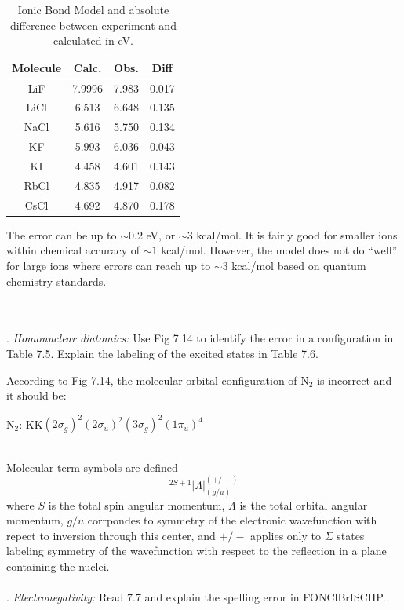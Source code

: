 \documentclass{article}
\begin{document}
{  \begin{table}[H]
    \centering
    \caption{Ionic Bond Model and absolute difference between experiment and calculated
      in eV.}
    \begin{tabular}{cccc}
      Molecule & Calc. & Obs. & Diff \\
      \hline
      LiF  & 7.9996 & 7.983 & 0.017 \\
      LiCl & 6.513  & 6.648 & 0.135 \\
      NaCl & 5.616  & 5.750 & 0.134 \\
      KF   & 5.993  & 6.036 & 0.043 \\
      KI   & 4.458  & 4.601 & 0.143 \\
      RbCl & 4.835  & 4.917 & 0.082 \\
      CsCl & 4.692  & 4.870 & 0.178
    \end{tabular}
  \end{table}
  
  The error can be up to $\sim 0.2$ eV, or $\sim 3$ kcal/mol. It is fairly good for smaller
  ions within chemical accuracy of $\sim 1$ kcal/mol. However, the model does not do ``well''
  for large ions where errors can reach up to $\sim 3$ kcal/mol based on quantum chemistry
  standards.}
  \\
  \\
  . \textit{Homonuclear diatomics:} Use Fig 7.14 to identify the error in a configuration
  in Table 7.5. Explain the labeling of the excited states in Table 7.6.
  \\

  {\color{blue}
  According to Fig 7.14, the molecular orbital configuration of N$_2$ is incorrect and it
  should be:

  N$_2$: KK$(2\sigma_g)^2(2\sigma_u)^2(3\sigma_g)^2(1\pi_u)^4$}
  \\

  {\color{blue}
  Molecular term symbols are defined
  \begin{equation*}
    ^{2S+1}|\Lambda|_{(g/u)}^{(+/-)}
  \end{equation*}
  \noindent where $S$ is the total spin angular momentum, $\Lambda$ is the total orbital
  angular momentum, $g/u$ corrpondes to symmetry of the electronic wavefunction with repect
  to inversion through this center, and $+/-$ applies only to $\Sigma$ states labeling
  symmetry of the wavefunction with respect to the reflection in a plane containing the
  nuclei.}
  \\
  \\
  . \textit{Electronegativity:} Read 7.7 and explain the spelling error in FONClBrISCHP.
  \\
\end{document}
